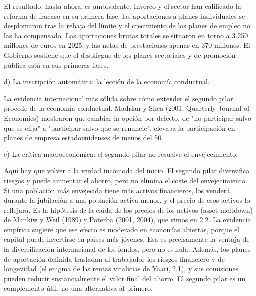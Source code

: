 \documentclass[10pt,a4paper]{article}
\begin{document}
El resultado, hasta ahora, es ambivalente. Inverco y el sector han calificado la reforma de fracaso en su primera fase: las aportaciones a planes individuales se desplomaron tras la rebaja del límite y el crecimiento de los planes de empleo no las ha compensado. Las aportaciones brutas totales se situaron en torno a 3.250 millones de euros en 2025, y las netas de prestaciones apenas en 370 millones. El Gobierno sostiene que el despliegue de los planes sectoriales y de promoción pública está en sus primeras fases.

d) La inscripción automática: la lección de la economía conductual.

La evidencia internacional más sólida sobre cómo extender el segundo pilar procede de la economía conductual. Madrian y Shea (2001, Quarterly Journal of Economics) mostraron que cambiar la opción por defecto, de "no participar salvo que se elija" a "participar salvo que se renuncie", elevaba la participación en planes de empresa estadounidenses de menos del 50%

e) La crítica macroeconómica: el segundo pilar no resuelve el envejecimiento.

Aquí hay que volver a la verdad incómoda del inicio. El segundo pilar diversifica riesgos y puede aumentar el ahorro, pero no elimina el coste del envejecimiento. Si una población más envejecida tiene más activos financieros, los venderá durante la jubilación a una población activa menor, y el precio de esos activos lo reflejará. Es la hipótesis de la caída de los precios de los activos (asset meltdown) de Mankiw y Weil (1989) y Poterba (2001, 2004), que vimos en 2.2. La evidencia empírica sugiere que ese efecto es moderado en economías abiertas, porque el capital puede invertirse en países más jóvenes. Esa es precisamente la ventaja de la diversificación internacional de los fondos, pero no es nula. Además, los planes de aportación definida trasladan al trabajador los riesgos financiero y de longevidad (el enigma de las rentas vitalicias de Yaari, 2.1), y sus comisiones pueden reducir sustancialmente el valor final del ahorro. El segundo pilar es un complemento útil, no una alternativa al primero.
\end{document}
